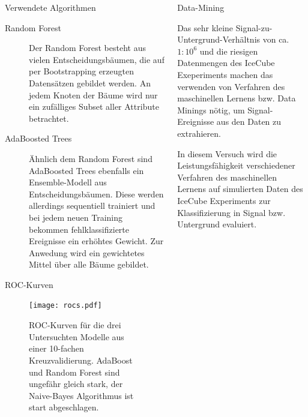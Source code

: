 \documentclass[t]{beamer}
\begin{document}
\begin{columns}[onlytextwidth]
\begin{column}{0.5\textwidth}
\begin{block}{Verwendete Algorithmen}
\begin{description}
          \item[Random Forest] Der Random Forest besteht aus vielen Entscheidungsbäumen,
            die auf per Bootstrapping erzeugten Datensätzen gebildet werden.
            An jedem Knoten der Bäume wird nur ein zufälliges Subset aller Attribute betrachtet.
          \item[AdaBoosted Trees] Ähnlich dem Random Forest sind AdaBoosted Trees
            ebenfalls ein Ensemble-Modell aus Entscheidungsbäumen.
            Diese werden allerdings sequentiell trainiert und bei jedem neuen
            Training bekommen fehlklassifizierte Ereignisse ein erhöhtes Gewicht.
            Zur Anwedung wird ein gewichtetes Mittel über alle Bäume gebildet.
        \end{description}
      \end{block}
      \begin{block}{ROC-Kurven}
        \begin{multicols}{2}
          \begin{figure}
            \centering
            \texttt{[image: rocs.pdf]}
            \caption{ROC-Kurven für die drei Untersuchten Modelle aus einer 10-fachen
            Kreuzvalidierung. AdaBoost und Random Forest sind ungefähr gleich stark,
          der Naive-Bayes Algorithmus ist start abgeschlagen.}
            \label{fig:name}
          \end{figure}
          \begin{center}
            
          \end{center}
        \end{multicols}
      \end{block}
    \end{column}%
    \begin{column}{0.5\textwidth}%
      \begin{block}{Data-Mining}%
        \begin{multicols}{2}
          Das sehr kleine Signal-zu-Untergrund-Verhältnis von ca.\ $1:10^6$ und die 
          riesigen Datenmengen des IceCube Exeperiments machen das 
          verwenden von Verfahren des maschinellen Lernens bzw. Data Minings nötig, 
          um Signal-Ereignisse aus den Daten zu extrahieren.

          In diesem Versuch wird die Leistungsfähigkeit verschiedener Verfahren
          des maschinellen Lernens auf simulierten Daten des IceCube Experiments 
          zur Klassifizierung in Signal bzw. Untergrund evaluiert.


\end{multicols}
\end{block}
\end{column}
\end{columns}
\end{document}
